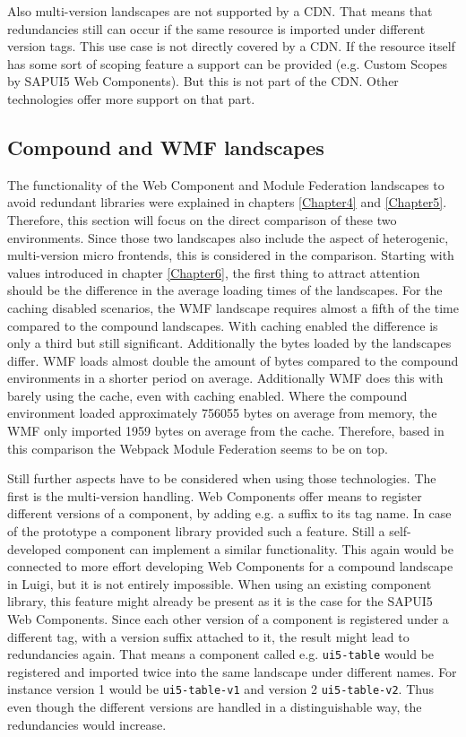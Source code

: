 Also multi-version landscapes are not supported by a CDN. That means that redundancies still can occur if the same resource is imported under different version tags. This use case is not directly covered by a CDN. If the resource itself has some sort of scoping feature a support can be provided (e.g. Custom Scopes by SAPUI5 Web Components). But this is not part of the CDN. Other technologies offer more support on that part.

\subsection{Compound and WMF landscapes}

The functionality of the Web Component and Module Federation landscapes to avoid redundant libraries were explained in chapters \ref{Chapter4} and \ref{Chapter5}. Therefore, this section will focus on the direct comparison of these two environments. Since those two landscapes also include the aspect of heterogenic, multi-version micro frontends, this is considered in the comparison. 
Starting with values introduced in chapter \ref{Chapter6}, the first thing to attract attention should be the difference in the average loading times of the landscapes. For the caching disabled scenarios, the WMF landscape requires almost a fifth of the time compared to the compound landscapes. With caching enabled the difference is only a third but still significant. Additionally the bytes loaded by the landscapes differ. WMF loads almost double the amount of bytes compared to the compound environments in a shorter period on average. Additionally WMF does this with barely using the cache, even with caching enabled. Where the compound environment loaded approximately 756055 bytes on average from memory, the WMF only imported 1959 bytes on average from the cache. Therefore, based in this comparison the Webpack Module Federation seems to be on top.

Still further aspects have to be considered when using those technologies. The first is the multi-version handling. Web Components offer means to register different versions of a component, by adding e.g. a suffix to its tag name. In case of the prototype a component library provided such a feature. Still a self-developed component can implement a similar functionality. This again would be connected to more effort developing Web Components for a compound landscape in Luigi, but it is not entirely impossible.
When using an existing component library, this feature might already be present as it is the case for the SAPUI5 Web Components. 
Since each other version of a component is registered under a different tag, with a version suffix attached to it, the result might lead to redundancies again. That means a component called e.g. \texttt{ui5-table} would be registered and imported twice into the same landscape under different names. For instance version 1 would be \texttt{ui5-table-v1} and version 2 \texttt{ui5-table-v2}. Thus even though the different versions are handled in a distinguishable way, the redundancies would increase.

